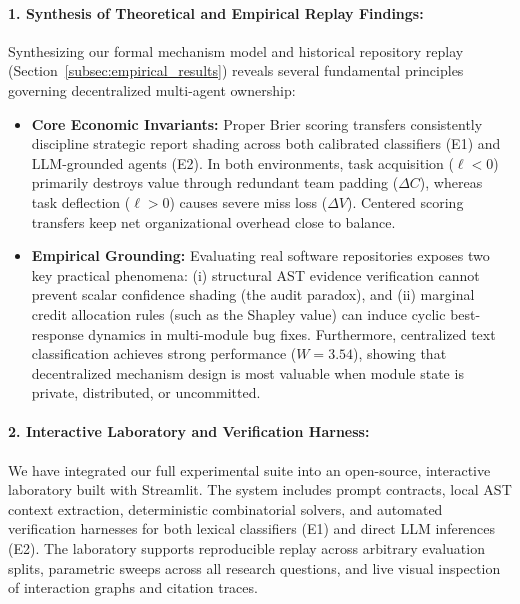 \documentclass{article}
\theoremstyle{definition}
\begin{document}
\paragraph{1. Synthesis of Theoretical and Empirical Replay Findings:}
Synthesizing our formal mechanism model and historical repository replay (Section~\ref{subsec:empirical_results}) reveals several fundamental principles governing decentralized multi-agent ownership:
\begin{itemize}
    \item \textbf{Core Economic Invariants:} Proper Brier scoring transfers consistently discipline strategic report shading across both calibrated classifiers (E1) and LLM-grounded agents (E2). In both environments, task acquisition ($\ell < 0$) primarily destroys value through redundant team padding ($\Delta C$), whereas task deflection ($\ell > 0$) causes severe miss loss ($\Delta V$). Centered scoring transfers keep net organizational overhead close to balance.
    \item \textbf{Empirical Grounding:} Evaluating real software repositories exposes two key practical phenomena: (i) structural AST evidence verification cannot prevent scalar confidence shading (the audit paradox), and (ii) marginal credit allocation rules (such as the Shapley value) can induce cyclic best-response dynamics in multi-module bug fixes. Furthermore, centralized text classification achieves strong performance ($W = 3.54$), showing that decentralized mechanism design is most valuable when module state is private, distributed, or uncommitted.
\end{itemize}

\paragraph{2. Interactive Laboratory and Verification Harness:}
We have integrated our full experimental suite into an open-source, interactive laboratory built with Streamlit. The system includes prompt contracts, local AST context extraction, deterministic combinatorial solvers, and automated verification harnesses for both lexical classifiers (E1) and direct LLM inferences (E2). The laboratory supports reproducible replay across arbitrary evaluation splits, parametric sweeps across all research questions, and live visual inspection of interaction graphs and citation traces.
\end{document}
